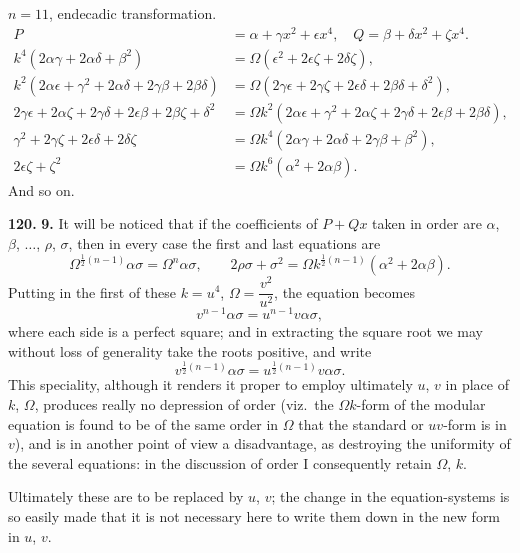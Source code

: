 \documentclass[11pt,a4paper]{book}
\begin{document}
$n = 11$, endecadic transformation.
\begin{align*}
P &= \alpha + \gamma x^2 + \epsilon x^4, \quad Q = \beta + \delta x^2 + \zeta x^4. \\
k^4(2\alpha\gamma + 2\alpha\delta + \beta^2) &= \Omega(\epsilon^2 + 2\epsilon\zeta + 2\delta\zeta), \\
k^2(2\alpha\epsilon + \gamma^2 + 2\alpha\delta + 2\gamma\beta + 2\beta\delta) &= \Omega(2\gamma\epsilon + 2\gamma\zeta + 2\epsilon\delta + 2\beta\delta + \delta^2), \\
2\gamma\epsilon + 2\alpha\zeta + 2\gamma\delta + 2\epsilon\beta + 2\beta\zeta + \delta^2 &= \Omega k^2(2\alpha\epsilon + \gamma^2 + 2\alpha\zeta + 2\gamma\delta + 2\epsilon\beta + 2\beta\delta), \\
\gamma^2 + 2\gamma\zeta + 2\epsilon\delta + 2\delta\zeta &= \Omega k^4(2\alpha\gamma + 2\alpha\delta + 2\gamma\beta + \beta^2), \\
2\epsilon\zeta + \zeta^2 &= \Omega k^6(\alpha^2 + 2\alpha\beta).
\end{align*}
And so on.


\noindent\textbf{120.} \textbf{9.} It will be noticed that if the coefficients of $P + Qx$ taken in order are $\alpha$, $\beta$, $\ldots$, $\rho$, $\sigma$, then in every case the first and last equations are
\[
\Omega^{\frac{1}{2}(n-1)}\alpha\sigma = \Omega^n\alpha\sigma, \qquad
2\rho\sigma + \sigma^2 = \Omega k^{\frac{1}{2}(n-1)}(\alpha^2 + 2\alpha\beta).
\]
Putting in the first of these $k = u^4$, $\Omega = \dfrac{v^2}{u^2}$, the equation becomes
\[
v^{n-1}\alpha\sigma = u^{n-1}v\alpha\sigma,
\]
where each side is a perfect square; and in extracting the square root we may without loss of generality take the roots positive, and write
\[
v^{\frac{1}{2}(n-1)}\alpha\sigma = u^{\frac{1}{2}(n-1)}v\alpha\sigma.
\]
This speciality, although it renders it proper to employ ultimately $u$, $v$ in place of $k$, $\Omega$, produces really no depression of order (viz.\ the $\Omega k$-form of the modular equation is found to be of the same order in $\Omega$ that the standard or $uv$-form is in $v$), and is in another point of view a disadvantage, as destroying the uniformity of the several equations: in the discussion of order I consequently retain $\Omega$, $k$.

Ultimately these are to be replaced by $u$, $v$; the change in the equation-systems is so easily made that it is not necessary here to write them down in the new form in $u$, $v$.
\end{document}
